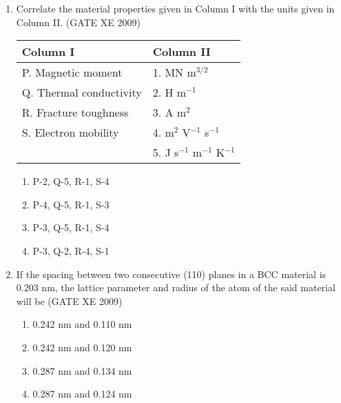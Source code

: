 \documentclass[journal]{IEEEtran}
\begin{document}
\begin{enumerate}

    \item Correlate the material properties given in Column I with the units given in Column II. \hfill (GATE XE 2009)

    \begin{table}[h!]
    \centering
    \begin{tabular}{l | l}
    \textbf{Column I}           & \textbf{Column II} \\
    \hline
    P. Magnetic moment          & 1. MN m$^{3/2}$ \\
    Q. Thermal conductivity      & 2. H m$^{-1}$ \\
    R. Fracture toughness        & 3. A m$^{2}$ \\
    S. Electron mobility         & 4. m$^{2}$ V$^{-1}$ s$^{-1}$ \\
                                & 5. J s$^{-1}$ m$^{-1}$ K$^{-1}$ \\
    \end{tabular}
    \end{table}

    \begin{multicols}{2}
        \begin{enumerate}
            \item P-2, Q-5, R-1, S-4
            \item P-4, Q-5, R-1, S-3
            \item P-3, Q-5, R-1, S-4
            \item P-3, Q-2, R-4, S-1
        \end{enumerate}
    \end{multicols}

    \item If the spacing between two consecutive (110) planes in a BCC material is 0.203 nm, the lattice parameter and radius of the atom of the said material will be  \hfill (GATE XE 2009)

    \begin{multicols}{2}
        \begin{enumerate}
            \item 0.242 nm and 0.110 nm
            \item 0.242 nm and 0.120 nm
            \item 0.287 nm and 0.134 nm
            \item 0.287 nm and 0.124 nm
        \end{enumerate}
    \end{multicols}


\end{enumerate}
\end{document}
